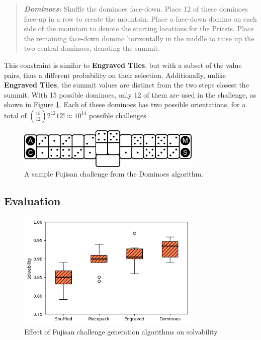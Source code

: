\documentclass[journal]{IEEEtran}
\begin{document}
\begin{quote}
    
  {\it \bf Dominoes:} Shuffle the dominoes face-down. Place 12 of these dominoes face-up in a row to create the mountain. Place a face-down domino on each side of the mountain to denote the starting locations for the Priests. Place the remaining face-down domino horizontally in the middle to raise up the two central dominoes, denoting the summit.
\end{quote}

This constraint is similar to \textbf{Engraved Tiles}, but with a subset of the value pairs, thus a different probability on their selection.  Additionally, unlike \textbf{Engraved Tiles}, the summit values are distinct from the two steps closest the summit.
With 15 possible dominoes, only 12 of them are used in the challenge, as shown in Figure \ref{fig:dominoexample}. Each of these dominoes has two possible orientations, for a total of ${15 \choose 12}2^{12}12! \approx 10^{14}$ possible challenges. 

\begin{figure}[b]
\includegraphics[width=8.8cm]{figure15.png}
\caption{A sample Fujisan challenge from the Dominoes algorithm.}
\label{fig:dominoexample}
\end{figure}

\subsection{Evaluation}

 \noindent


\begin{figure}[t]
\includegraphics[width=8.8cm]{figure16.png}
\caption{Effect of Fujisan challenge generation algorithms on solvability.}
\label{fig:strategycomp}
\end{figure}
\end{document}
